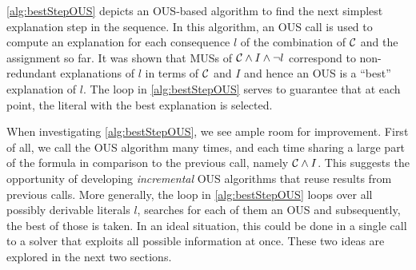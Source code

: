 \cref{alg:bestStepOUS} depicts an OUS-based algorithm to find the next simplest explanation step in the sequence. 
In this algorithm, an OUS call is used to compute an explanation for each consequence $l$ of the combination of $\mathcal{C} $ and the assignment so far. 
It was shown that MUSs of $\mathcal{C} \land I\land\lnot l$ correspond to non-redundant explanations of $l$ in terms of $\mathcal{C} $ and $I$ and hence an OUS is a ``best'' explanation of $l$. 
The loop in \cref{alg:bestStepOUS} serves to guarantee that at each point, the literal with the best explanation is selected. 





When investigating \cref{alg:bestStepOUS}, we see ample room for improvement. 
First of all, we call the OUS algorithm many times, and each time sharing a large part of the formula in comparison to the previous call, namely $\mathcal{C}  \land I$.
This suggests the opportunity of developing \emph{incremental} OUS algorithms that reuse results from previous calls. 
More generally, the loop in \cref{alg:bestStepOUS} loops over all possibly derivable  literals $l$, searches for each of them an OUS and subsequently, the best of those is taken. 
In an ideal situation, this could be done in a single call to a solver that exploits all possible information at once. 
These two ideas are explored in the next two sections.
